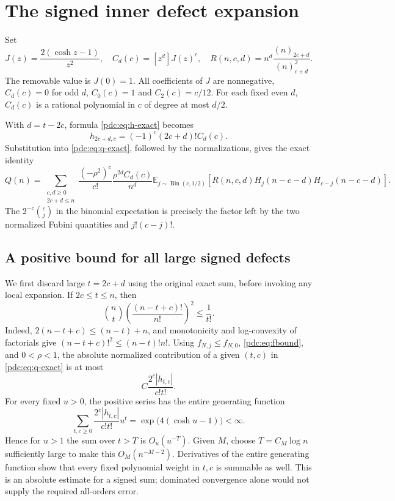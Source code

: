 \documentclass[11pt,letterpaper]{article}
\theoremstyle{remark}\newtheorem{remark}[theorem]{Remark}
\newcommand{\fall}[2]{(#1)_{#2}}
\newcommand{\E}{\mathbb E}
\newcommand{\coef}[2]{[#1^{#2}]}
\DeclareMathOperator{\Bin}{Bin}
\begin{document}
\section{The signed inner defect expansion}
\label{pdc:sec:inner}
Set
\begin{equation}\label{pdc:eq:inner-defs}
 J(z)=\frac{2(\cosh z-1)}{z^2},\quad
 C_d(c)=\coef{z}{d}J(z)^c,\quad
 R(n,c,d)=n^d\frac{\fall{n}{2c+d}}{\fall{n}{c+d}^2}.
\end{equation}
The removable value is $J(0)=1$. All coefficients of $J$ are nonnegative, $C_d(c)=0$ for odd $d$, $C_0(c)=1$ and $C_2(c)=c/12$. For each fixed even $d$, $C_d(c)$ is a rational polynomial in $c$ of degree at most $d/2$.

With $d=t-2c$, formula \eqref{pdc:eq:h-exact} becomes
\[
 h_{2c+d,c}=(-1)^c(2c+d)!C_d(c).
\]
Substitution into \eqref{pdc:eq:q-exact}, followed by the normalizations, gives the exact identity
\begin{equation}\label{pdc:eq:inner-exact}
 Q(n)=\sum_{\substack{c,d\geq0\\2c+d\leq n}}
 \frac{(-\rho^2)^c}{c!}\frac{\rho^{2d}C_d(c)}{n^d}
 \E_{j\sim\Bin(c,1/2)}
 \left[R(n,c,d)H_j(n-c-d)H_{c-j}(n-c-d)\right].
\end{equation}
The $2^{-c}\binom cj$ in the binomial expectation is precisely the factor left by the two normalized Fubini quantities and $j!(c-j)!$.

\subsection{A positive bound for all large signed defects}
We first discard large $t=2c+d$ using the original exact sum, before invoking any local expansion. If $2c\leq t\leq n$, then
\begin{equation}\label{pdc:eq:factorial-bound}
 \binom nt\left(\frac{(n-t+c)!}{n!}\right)^2\leq\frac1{t!}.
\end{equation}
Indeed, $2(n-t+c)\leq(n-t)+n$, and monotonicity and log-convexity of factorials give $(n-t+c)!^2\leq(n-t)!n!$. Using $f_{N,j}\leq f_{N,0}$, \eqref{pdc:eq:fbound}, and $0<\rho<1$, the absolute normalized contribution of a given $(t,c)$ in \eqref{pdc:eq:q-exact} is at most
\begin{equation}\label{pdc:eq:inner-majorant}
 C\frac{2^c|h_{t,c}|}{c!t!}.
\end{equation}
For every fixed $u>0$, the positive series has the entire generating function
\begin{equation}\label{pdc:eq:entire-tail}
 \sum_{t,c\geq0}\frac{2^c|h_{t,c}|}{c!t!}u^t
        =\exp\bigl(4(\cosh u-1)\bigr)<\infty.
\end{equation}
Hence for $u>1$ the sum over $t>T$ is $O_u(u^{-T})$. Given $M$, choose $T=C_M\log n$ sufficiently large to make this $O_M(n^{-M-2})$. Derivatives of the entire generating function show that every fixed polynomial weight in $t,c$ is summable as well. This is an absolute estimate for a signed sum; dominated convergence alone would not supply the required all-orders error.
\end{document}
